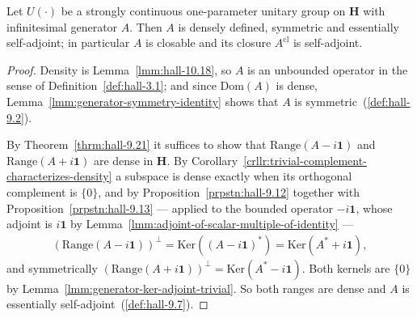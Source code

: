 \begin{lemma}
    \label{lmm:generator-essentially-self-adjoint}
    \leanok
    Let $U(\cdot)$ be a strongly continuous one-parameter unitary group on $\mathbf{H}$ with infinitesimal generator $A$. Then $A$ is densely defined, symmetric and essentially self-adjoint; in particular $A$ is closable and its closure $A^{\text{cl}}$ is self-adjoint.
\end{lemma}
\begin{proof}
    \leanok
Density is Lemma~\ref{lmm:hall-10.18}, so $A$ is an unbounded operator in the sense of Definition~\ref{def:hall-3.1}; and since $\text{Dom}(A)$ is dense, Lemma~\ref{lmm:generator-symmetry-identity} shows that $A$ is symmetric~(\ref{def:hall-9.2}).

By Theorem~\ref{thrm:hall-9.21} it suffices to show that $\text{Range}(A - i\mathbf{1})$ and $\text{Range}(A + i\mathbf{1})$ are dense in $\mathbf{H}$. By Corollary~\ref{crllr:trivial-complement-characterizes-density} a subspace is dense exactly when its orthogonal complement is $\{0\}$, and by Proposition~\ref{prpstn:hall-9.12} together with Proposition~\ref{prpstn:hall-9.13} — applied to the bounded operator $-i\mathbf{1}$, whose adjoint is $i\mathbf{1}$ by Lemma~\ref{lmm:adjoint-of-scalar-multiple-of-identity} —
\begin{align}
    \left( \text{Range}(A - i\mathbf{1}) \right)^\perp = \text{Ker}\left( (A - i\mathbf{1})^* \right) = \text{Ker}(A^* + i\mathbf{1}),
\end{align}
and symmetrically $\left( \text{Range}(A + i\mathbf{1}) \right)^\perp = \text{Ker}(A^* - i\mathbf{1})$. Both kernels are $\{0\}$ by Lemma~\ref{lmm:generator-ker-adjoint-trivial}. So both ranges are dense and $A$ is essentially self-adjoint~(\ref{def:hall-9.7}).
\end{proof}

